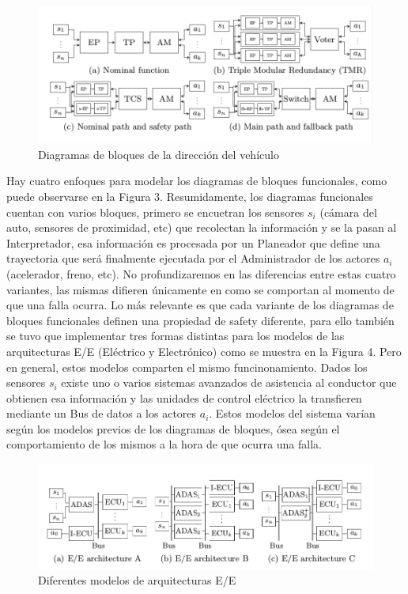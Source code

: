 \documentclass[11pt]{article}
\begin{document}
\begin{figure}[h]
	\includegraphics[scale=0.43]{blockdiagram.png} 
	\centering
	\caption{Diagramas de bloques de la direcci\'on del veh\'iculo}
\end{figure}

Hay cuatro enfoques para modelar los diagramas de bloques funcionales, como puede observarse en la Figura 3. Resumidamente, los diagramas funcionales cuentan con varios bloques, primero se encuetran los sensores $s_i$ (c\'amara del auto, sensores de proximidad, etc) que recolectan la informaci\'on y se la pasan al Interpretador, esa informaci\'on es procesada por un Planeador que define una trayectoria que ser\'a finalmente ejecutada por el Administrador de los actores $a_i$ (acelerador, freno, etc). No profundizaremos en las diferencias entre estas cuatro variantes, las mismas difieren \'unicamente en como se comportan al momento de que una falla ocurra. Lo m\'as relevante es que cada variante de los diagramas de bloques funcionales definen una propiedad de safety diferente, para ello tambi\'en se tuvo que implementar tres formas distintas para los modelos de las arquitecturas E/E (El\'ectrico y Electr\'onico) como se muestra en la Figura 4. Pero en general, estos modelos comparten el mismo funcinonamiento. Dados los sensores $s_i$ existe uno o varios sistemas avanzados de asistencia al conductor que obtienen esa informaci\'on y las unidades de control el\'ectrico la transfieren mediante un Bus de datos a los actores $a_i$. Estos modelos del sistema var\'ian seg\'un los modelos previos de los diagramas de bloques, \'osea seg\'un el comportamiento de los mismos a la hora de que ocurra una falla.

\begin{figure}[h]
	\includegraphics[scale=0.4]{EE.png}
	\centering
	\caption{Diferentes modelos de arquitecturas E/E}
\end{figure}
\end{document}
